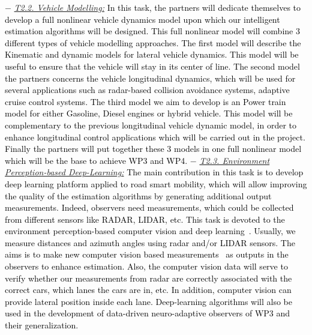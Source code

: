 \documentclass[a4paper,11pt]{article}
\begin{document}
\begin{itemize}[leftmargin=.2in,noitemsep,nolistsep]
\subitem$-$  \underline{\it T2.2. Vehicle Modelling:} 
\textcolor{black}{In this task, the partners will dedicate themselves to develop a full nonlinear vehicle dynamics model upon which  our intelligent estimation algorithms will be designed. This full nonlinear model will combine  3 different types of vehicle modelling approaches. The first model will describe the  Kinematic and dynamic models for lateral vehicle dynamics. This model will be useful to ensure that the vehicle will stay in its center of line. The second model the partners  concerns the vehicle longitudinal dynamics, which will be used for several applications such as  radar-based collision avoidance systems, adaptive cruise control systems. The third model we aim to develop is an Power train model for either  Gasoline, Diesel engines or hybrid vehicle. This model will be complementary to the  previous longitudinal vehicle dynamic model, in order to enhance longitudinal control applications which will be carried out in the project. Finally the partners will put together these 3 models in one  full nonlinear model which  will be the base to achieve WP3 and WP4.}
%
\subitem$-$  \underline{\it T2.3. Environment Perception-based Deep-Learning:}
\textcolor{black}{
\textcolor{black}{
The main contribution in this task is to develop deep learning platform applied to road smart mobility, which will allow improving the quality of the estimation algorithms by generating additional output measurements. Indeed, observers need measurements, which could be collected from different sensors like RADAR, LIDAR, etc. This task is devoted to the environment perception-based computer vision and deep learning~\cite{mauri2020deep}. Usually, we measure distances and azimuth angles using radar and/or LIDAR sensors. The aims is to make new computer vision based measurements~\cite{khemmar2019real} as outputs in the observers to enhance estimation. Also, the computer vision data will serve to verify whether our measurements from radar are correctly associated with the correct cars, which lanes the cars are in, etc. In addition, computer vision can provide lateral position inside each lane. Deep-learning algorithms will also be used in the development of data-driven neuro-adaptive observers of WP3 and their generalization.
}}
\end{itemize}
\end{document}
